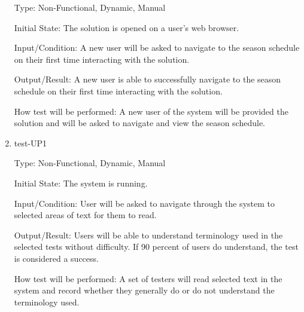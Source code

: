 \documentclass[12pt, titlepage]{article}
\begin{document}
\begin{enumerate}
  Type: Non-Functional, Dynamic, Manual

  Initial State: The solution is opened on a user's web browser.

  Input/Condition: A new user will be asked to navigate to the season schedule on their first
  time interacting with the solution.

  Output/Result: A new user is able to successfully navigate to the season schedule on
  their first time interacting with the solution.

  How test will be performed: A new user of the system will be provided the solution and
  will be asked to navigate and view the season schedule.

  \item{test-UP1\\}

  Type: Non-Functional, Dynamic, Manual

  Initial State: The system is running.

  Input/Condition: User will be asked to navigate through the system to 
  selected areas of text for them to read.

  Output/Result: Users will be able to understand terminology used in
  the selected tests without difficulty. If 90 percent of users do understand,
  the test is considered a success.

  How test will be performed: A set of testers will read selected text
  in the system and record whether they generally do or do not 
  understand the terminology used. 










\end{enumerate}
\end{document}
